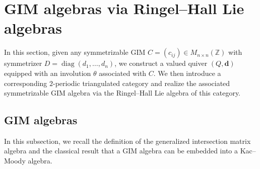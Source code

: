 \documentclass[12pt,reqno]{amsart}
\numberwithin{equation}{section}
\renewcommand{\mod}{\operatorname{mod}\nolimits}
\begin{document}
	
	
	
	
	
	\section{GIM algebras via Ringel--Hall Lie algebras}\label{s:GIM-RH-Lie}
	
	In this section, given any symmetrizable GIM
	$C=(c_{ij})\in M_{n\times n}(\mathbb{Z})$ with symmetrizer
	$D=\operatorname{diag}(d_1,\ldots,d_n)$, we construct a valued quiver
	$(Q,\mathbf d)$ equipped with an involution $\theta$ associated with $C$.
	We then introduce a corresponding $2$-periodic triangulated category and
	realize the associated symmetrizable GIM algebra via the Ringel--Hall Lie
	algebra of this category.
	
	\subsection{GIM algebras}\label{ss:GIM algebra} In this subsection, we recall the definition of the generalized intersection matrix algebra and the classical result \cite{B89-GIM-alg} that a GIM algebra can be embedded into a Kac--Moody algebra.
	
\end{document}

